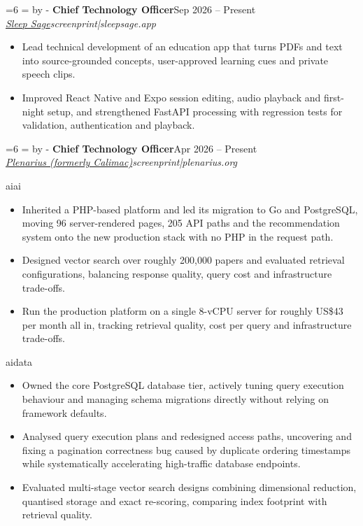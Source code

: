 \documentclass[11pt, a4paper]{article}
\newcommand{\needroom}[1]{%
  \par\begingroup
  \dimen0=#1\relax
  \dimen2=\pagegoal\relax\advance\dimen2 by -\pagetotal\relax
  \ifdim\dimen0>\dimen2\relax\newpage\fi
  \endgroup
}
\newcommand{\role}[4]{%
  \needroom{6\baselineskip}%
  \noindent\textbf{#1}\hfill\textcolor{muted}{#2}\\
  \textit{#3}\hfill\textcolor{muted}{#4}\vspace{3pt}%
}
\def\variant{ai}
\newcommand{\AI}[1]{\ifx\variant\VAI#1\fi}
\newcommand{\DATA}[1]{\ifx\variant\VDATA#1\fi}
\def\VAI{ai}
\def\VDATA{data}
\def\medium{screen}
\def\MPRINT{print}
\newcommand{\PRINT}[1]{\ifx\medium\MPRINT#1\fi}
\begin{document}
\role{Chief Technology Officer}{Sep 2026 -- Present}
{\href{https://sleepsage.app}{Sleep Sage}\PRINT{\enspace|\enspace sleepsage.app}}{}
\begin{itemize}
\item Lead technical development of an education app that turns PDFs and text into source-grounded concepts, user-approved learning cues and private speech clips.
\item Improved React Native and Expo session editing, audio playback and first-night setup, and strengthened FastAPI processing with regression tests for validation, authentication and playback.
\end{itemize}
\vspace{4pt}

\role{Chief Technology Officer}{Apr 2026 -- Present}
{\href{https://plenarius.org}{Plenarius (formerly Calimac)}\PRINT{\enspace|\enspace plenarius.org}}{}
\AI{
\begin{itemize}
\item Inherited a PHP-based platform and led its migration to Go and PostgreSQL, moving 96 server-rendered pages, 205 API paths and the recommendation system onto the new production stack with no PHP in the request path.
\item Designed vector search over roughly 200,000 papers and evaluated retrieval configurations, balancing response quality, query cost and infrastructure trade-offs.
\item Run the production platform on a single 8-vCPU server for roughly US\$43 per month all in, tracking retrieval quality, cost per query and infrastructure trade-offs.
\end{itemize}
}

\DATA{
\begin{itemize}
\item Owned the core PostgreSQL database tier, actively tuning query execution behaviour and managing schema migrations directly without relying on framework defaults.
\item Analysed query execution plans and redesigned access paths, uncovering and fixing a pagination correctness bug caused by duplicate ordering timestamps while systematically accelerating high-traffic database endpoints.
\item Evaluated multi-stage vector search designs combining dimensional reduction, quantised storage and exact re-scoring, comparing index footprint with retrieval quality.
\end{itemize}
}
\end{document}
